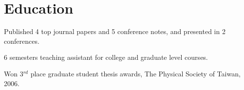 \documentclass[letterpaper]{deedy-resume-openfont}
\begin{document}



\section{Education} 

\begin{tightemize}
\item Published 4 top journal papers and 5 conference notes, and presented in 2 conferences.
\item 6 semesters teaching assistant for college and graduate level courses.
\end{tightemize}
\sectionsep

\begin{tightemize}
\item Won 3$^{rd}$ place graduate student thesis awards, The Physical Society of Taiwan, 2006.
\end{tightemize}
\sectionsep

\end{document}
